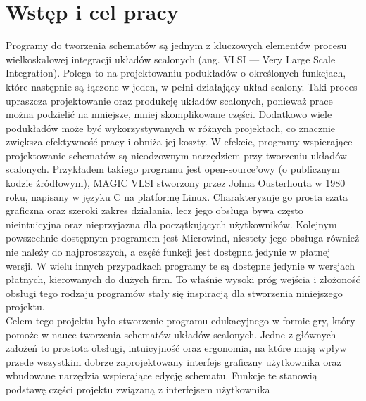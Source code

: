 \chapter{Wstęp i cel pracy}

Programy do tworzenia schematów są jednym z kluczowych elementów
procesu wielkoskalowej integracji układów scalonych (ang. VLSI — Very Large Scale Integration)\cite{VLSI_insemi}.
Polega to na projektowaniu podukładów o określonych funkcjach,
które następnie są łączone w jeden, w pełni działający układ scalony.
Taki proces upraszcza projektowanie oraz produkcję układów scalonych, ponieważ prace można podzielić na mniejsze,
mniej skomplikowane części.
Dodatkowo wiele podukładów może być wykorzystywanych w różnych projektach,
co znacznie zwiększa efektywność pracy i obniża jej koszty.
W efekcie,
programy wspierające projektowanie schematów są nieodzownym narzędziem przy tworzeniu układów scalonych.
Przykładem takiego programu jest open-source'owy (o publicznym kodzie źródłowym),
MAGIC VLSI stworzony przez Johna Ousterhouta w 1980 roku\cite{MAGIC},
napisany w języku C na platformę Linux\cite{MAGIC_wiki}.
Charakteryzuje go prosta szata graficzna oraz szeroki zakres działania,
lecz jego obsługa bywa często nieintuicyjna oraz nieprzyjazna dla początkujących użytkowników.
Kolejnym powszechnie dostępnym programem jest Microwind\cite{Microwind},
niestety jego obsługa również nie należy do najprostszych, a część funkcji jest dostępna jedynie w płatnej wersji.
W wielu innych przypadkach programy te są dostępne jedynie w wersjach płatnych, kierowanych do dużych firm.
To właśnie wysoki próg wejścia
i złożoność obsługi tego rodzaju programów stały się inspiracją dla stworzenia niniejszego projektu.\\
\indent Celem tego projektu było stworzenie
programu edukacyjnego w formie gry, który pomoże w nauce tworzenia schematów układów scalonych.
Jedne z głównych założeń to prostota obsługi, intuicyjność oraz ergonomia,
na które mają wpływ przede wszystkim dobrze zaprojektowany interfejs graficzny użytkownika
oraz wbudowane narzędzia wspierające edycję schematu.
Funkcje te stanowią podstawę części projektu związaną z interfejsem użytkownika
